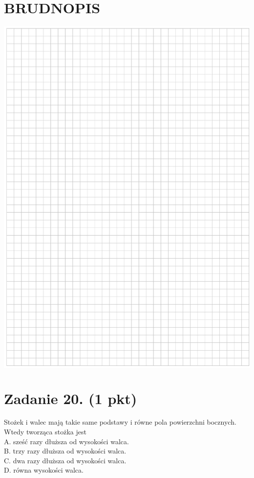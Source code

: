 \documentclass[10pt]{article}
\begin{document}
\section*{BRUDNOPIS}
\begin{center}
\includegraphics[max width=\textwidth]{2024_11_21_0c267759828927e3a26dg-07}
\end{center}

\section*{Zadanie 20. (1 pkt)}
Stożek i walec mają takie same podstawy i równe pola powierzchni bocznych. Wtedy tworząca stożka jest\\
A. sześć razy dłuższa od wysokości walca.\\
B. trzy razy dłuższa od wysokości walca.\\
C. dwa razy dłuższa od wysokości walca.\\
D. równa wysokości walca.
\end{document}
